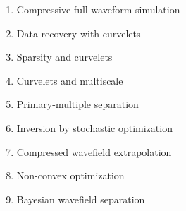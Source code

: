 \documentclass[11 pt]{amsart}
\begin{document}
\begin{enumerate}
\item Compressive full waveform simulation~\cite{herrmann2009GEOPcsf}

\item Data recovery with curvelets~\cite{herrmann2008GJInps}

\item Sparsity and curvelets~\cite{herrmann2008ACHAsac}

\item Curvelets and multiscale~\cite{herrmann2008GEOPcbs}

\item Primary-multiple separation~\cite{herrmann2008GEOPacd}

\item Inversion by stochastic optimization~\cite{vanLeeuwen2010IJGswi}

\item Compressed wavefield extrapolation~\cite{lin2007GEOPcwe}

\item Non-convex optimization~\cite{saab2008ACHAsrb}

\item Bayesian wavefield separation~\cite{wang2008GEOPbws}

\end{enumerate}


\vspace{-.2cm}


\end{document}

